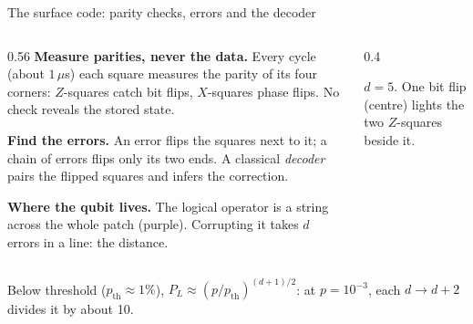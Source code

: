 \documentclass[aspectratio=169,11pt]{beamer}
\newcommand{\cnt}[1]{\textcolor{cblue}{#1}}
\newcommand{\tgt}[1]{\textcolor{cverm}{#1}}
\newcommand{\per}[1]{\textcolor{cpurple}{#1}}
\begin{document}
{
\begin{frame}[noframenumbering]{The surface code: parity checks, errors and the decoder}
  \begin{columns}[T,onlytextwidth]
    \begin{column}{0.56\textwidth}
      \small
      \textbf{Measure parities, never the data.} Every cycle (about $1\,\mu$s) each square measures the parity of its four corners: \cnt{$Z$-squares} catch bit flips, \tgt{$X$-squares} phase flips. No check reveals the stored state.\par\vskip0.8mm
      \textbf{Find the errors.} An error flips the squares next to it; a chain of errors flips only its two ends. A classical \emph{decoder} pairs the flipped squares and infers the correction.\par\vskip0.8mm
      \textbf{Where the qubit lives.} The logical operator is a string across the whole patch (\per{purple}). Corrupting it takes $d$ errors in a line: the distance.
    \end{column}
    \begin{column}{0.4\textwidth}
      \centering
      \par
      \vskip0.5mm
      {\scriptsize $d=5$. One bit flip (centre) lights the two $Z$-squares beside it.}
    \end{column}
  \end{columns}
  \vskip1mm
  \begin{takeaway}Below threshold ($p_{\mathrm{th}}\approx1\%$), $P_L\approx(p/p_{\mathrm{th}})^{(d+1)/2}$: at $p=10^{-3}$, each $d\to d+2$ divides it by about 10.\end{takeaway}
\end{frame}}
\end{document}
